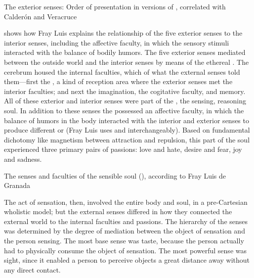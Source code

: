\begin{table}
    \caption{The exterior senses: Order of presentation in versions of , correlated with Calderón and Veracruce}
    \label{table:senses-order}
\end{table}

 shows how Fray Luis explains the relationship of the five exterior senses to the interior senses, including the affective faculty, in which the sensory stimuli interacted with the balance of bodily humors.
The five exterior senses mediated between the outside world and the interior senses by means of the ethereal .
The cerebrum housed the internal faculties, which  of what the external senses told them---first the , a kind of reception area where the exterior senses met the interior faculties; and next the imagination, the cogitative faculty, and memory.
All of these exterior and interior senses were part of the , the sensing, reasoning soul.
In addition to these senses the  possessed an affective faculty, in which the balance of humors in the body interacted with the interior and exterior senses to produce different  or  (Fray Luis uses  and  interchangeably).
Based on fundamental dichotomy like magnetism between attraction and repulsion, this  part of the soul experienced three primary pairs of passions: love and hate, desire and fear, joy and sadness.%
    \Autocite[pt.~I, ch.~27--35, pp.~439--494]{LuisdeGranada-Balcells:SimboloPtI}

\begin{table}
    \caption{The senses and faculties of the sensible soul (), according to Fray Luis de Granada}
    \label{table:senses-fray-luis}
\end{table}

The act of sensation, then, involved the entire body and soul, in a pre-Cartesian wholistic model; but the external senses differed in how they connected the external world to the internal faculties and passions.
The hierarchy of the senses was determined by the degree of mediation between the object of sensation and the person sensing.
The most base sense was taste, because the person actually had to physically consume the object of sensation.
The most powerful sense was sight, since it enabled a person to perceive objects a great distance away without any direct contact.

